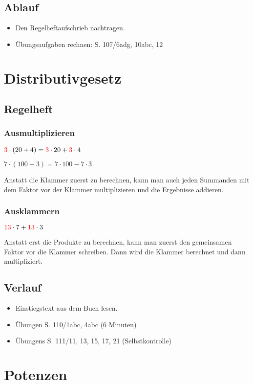 \documentclass[parskip=half-,a4paper]{scrartcl} %
\newcommand{\red}[1]{{\color{red}#1}}
\begin{document}
\subsection{Ablauf}

\begin{itemize}
	\item Den Regelheftaufschrieb nachtragen.
	\item Übungsaufgaben rechnen: S. 107/6adg, 10abc, 12
\end{itemize}

\section{Distributivgesetz}
\subsection{Regelheft}
\subsubsection{Ausmultiplizieren}
$\red{3}\cdot (20+4) = \red{3}\cdot 20 + \red{3} \cdot 4$

$7\cdot (100-3) = 7\cdot 100 - 7 \cdot 3$

Anstatt die Klammer zuerst zu berechnen, kann man auch jeden Summanden mit dem
Faktor vor der Klammer multiplizieren und die Ergebnisse addieren.

\subsubsection{Ausklammern}
$\red{13}\cdot 7 + \red{13} \cdot 3$

Anstatt erst die Produkte zu berechnen, kann man zuerst den gemeinsamen Faktor
vor die Klammer schreiben. Dann wird die Klammer berechnet und dann
multipliziert.

\subsection{Verlauf}
\begin{itemize}
	\item Einstiegstext aus dem Buch lesen.
	\item Übungen S. 110/1abc, 4abc (6 Minuten)
	\item Übungens S. 111/11, 13, 15, 17, 21 (Selbstkontrolle)
\end{itemize}

\newpage
\section{Potenzen}
\end{document}
